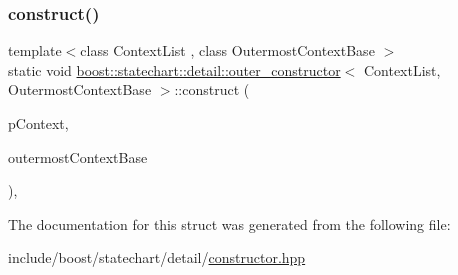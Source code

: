 \subsubsection{\texorpdfstring{construct()}{construct()}}
{\footnotesize\ttfamily template$<$class Context\+List , class Outermost\+Context\+Base $>$ \\
static void \mbox{\hyperlink{structboost_1_1statechart_1_1detail_1_1outer__constructor}{boost\+::statechart\+::detail\+::outer\+\_\+constructor}}$<$ Context\+List, Outermost\+Context\+Base $>$\+::construct (\begin{DoxyParamCaption}\item[{const \mbox{\hyperlink{structboost_1_1statechart_1_1detail_1_1outer__constructor_a2cfbd893ac80c92ac2e6ba1149851266}{context\+\_\+ptr\+\_\+type}} \&}]{p\+Context,  }\item[{Outermost\+Context\+Base \&}]{outermost\+Context\+Base }\end{DoxyParamCaption})\hspace{0.3cm}{\ttfamily [inline]}, {\ttfamily [static]}}



The documentation for this struct was generated from the following file\+:\begin{DoxyCompactItemize}
\item 
include/boost/statechart/detail/\mbox{\hyperlink{constructor_8hpp}{constructor.\+hpp}}\end{DoxyCompactItemize}
